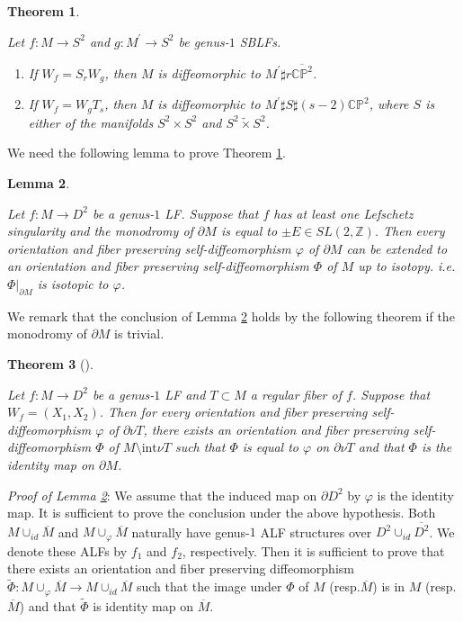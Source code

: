 \documentclass{amsart}
\theoremstyle{plain}
\newtheorem{thm}{Theorem}[section]
\newtheorem{lem}[thm]{Lemma}
\theoremstyle{definition}
\begin{document}
\begin{thm}\label{connectword}

Let $f:M\rightarrow S^2$ and $g:M^\prime\rightarrow S^2$ be genus-$1$ SBLFs. 

\begin{enumerate}[(1)]

\item If $W_f=S_rW_g$, then $M$ is diffeomorphic to $M^\prime\sharp r\overline{\mathbb{CP}^2}$. 

\item If $W_f=W_gT_s$, then $M$ is diffeomorphic to $M^\prime\sharp S\sharp(s-2)\mathbb{CP}^2$, 
where $S$ is either of the manifolds $S^2\times S^2$ and $S^2\tilde{\times}S^2$. 

\end{enumerate}

\end{thm}

We need the following lemma to prove Theorem \ref{connectword}. 

\begin{lem}\label{ex-lem}

Let $f:M\rightarrow D^2$ be a genus-$1$ LF. 
Suppose that $f$ has at least one Lefschetz singularity and the monodromy of $\partial M$ is equal to $\pm E\in SL(2,\mathbb{Z})$. 
Then every orientation and fiber preserving self-diffeomorphism $\varphi$ of $\partial M$ can be extended to an orientation and fiber preserving self-diffeomorphism $\Phi$ of $M$ up to isotopy. 
i.e. $\Phi|_{\partial M}$ is isotopic to $\varphi$. 

\end{lem}

We remark that the conclusion of Lemma \ref{ex-lem} holds by the following theorem if the monodromy of $\partial M$ is trivial. 

\begin{thm}[\cite{Moish}]\label{Moish-thm}

Let $f:M\rightarrow D^2$ be a genus-$1$ LF and $T\subset M$ a regular fiber of $f$. 
Suppose that $W_f=(X_1,X_2)$. 
Then for every orientation and fiber preserving self-diffeomorphism $\varphi$ of $\partial\nu T$, 
there exists an orientation and fiber preserving self-diffeomorphism $\Phi$ of $M\setminus\text{int}\nu T$ such that $\Phi$ is equal to $\varphi$ on $\partial\nu T$ 
and that $\Phi$ is the identity map on $\partial M$. 

\end{thm}

{\it Proof of Lemma \ref{ex-lem}}: We assume that the induced map on $\partial D^2$ by $\varphi$ is the identity map. 
It is sufficient to prove the conclusion under the above hypothesis. 
Both $M\cup_{id}\overline{M}$ and $M\cup_{\varphi}\overline{M}$ naturally have genus-$1$ ALF structures over $D^2\cup_{id}\overline{D^2}$. 
We denote these ALFs by $f_1$ and $f_2$, respectively. 
Then it is sufficient to prove that there exists an orientation and fiber preserving diffeomorphism $\tilde{\Phi}:M\cup_{\varphi}\overline{M}\rightarrow M\cup_{id}\overline{M}$ 
such that the image under $\Phi$ of $M$ (resp.$\overline{M}$) is in $M$ (resp.$\overline{M}$) and that $\tilde{\Phi}$ is identity map on $\overline{M}$. 
\end{document}
